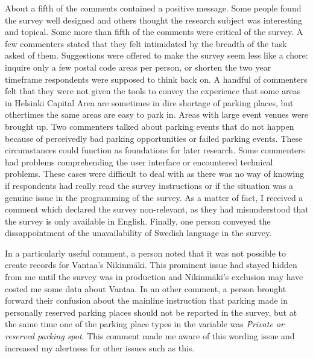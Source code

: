 About a fifth of the comments contained a positive message. Some people found the survey well designed and others thought the research subject was interesting and topical. Some more than fifth of the comments were critical of the survey. A few commenters stated that they felt intimidated by the breadth of the task asked of them. Suggestions were offered to make the survey seem less like a chore: inquire only a few postal code areas per person, or shorten the two year timeframe respondents were supposed to think back on. A handful of commenters felt that they were not given the tools to convey the experience that some areas in Helsinki Capital Area are sometimes in dire shortage of parking places, but othertimes the same areas are easy to park in. Areas with large event venues were brought up. Two commenters talked about parking events that do not happen because of perceivedly bad parking opportunities or failed parking events. These circumstances could function as foundations for later research. Some commenters had problems comprehending the user interface or encountered technical problems. These cases were difficult to deal with as there was no way of knowing if respondents had really read the survey instructions or if the situation was a genuine issue in the programming of the survey. As a matter of fact, I received a comment which declared the survey non-relevant, as they had misunderstood that the survey is only available in English. Finally, one person conveyed the dissappointment of the unavailability of Swedish language in the survey.

In a particularly useful comment, a person noted that it was not possible to create records for Vantaa's Nikinmäki. This prominent issue had stayed hidden from me until the survey was in production and Nikinmäki's exclusion may have costed me some data about Vantaa. In an other comment, a person brought forward their confusion about the mainline instruction that parking made in personally reserved parking places should not be reported in the survey, but at the same time one of the parking place types in the variable  was \textit{Private or reserved parking spot}. This comment made me aware of this wording issue and increased my alertness for other issues such as this.

